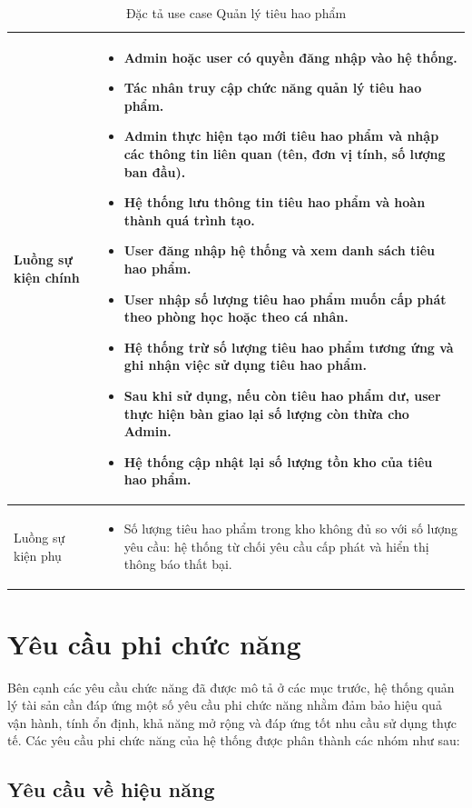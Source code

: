 \documentclass[../DoAn.tex]{subfiles}
\begin{document}
\begin{table}[H]
\begin{tabular}{|p{4cm}|p{11cm}|}
Luồng sự kiện chính &
\begin{itemize}
    \item Admin hoặc user có quyền đăng nhập vào hệ thống.
    \item Tác nhân truy cập chức năng quản lý tiêu hao phẩm.
    \item Admin thực hiện tạo mới tiêu hao phẩm và nhập các thông tin liên quan (tên, đơn vị tính, số lượng ban đầu).
    \item Hệ thống lưu thông tin tiêu hao phẩm và hoàn thành quá trình tạo.
    \item User đăng nhập hệ thống và xem danh sách tiêu hao phẩm.
    \item User nhập số lượng tiêu hao phẩm muốn cấp phát theo phòng học hoặc theo cá nhân.
    \item Hệ thống trừ số lượng tiêu hao phẩm tương ứng và ghi nhận việc sử dụng tiêu hao phẩm.
    \item Sau khi sử dụng, nếu còn tiêu hao phẩm dư, user thực hiện bàn giao lại số lượng còn thừa cho Admin.
    \item Hệ thống cập nhật lại số lượng tồn kho của tiêu hao phẩm.
\end{itemize} \\
\hline

Luồng sự kiện phụ &
\begin{itemize}
    \item Số lượng tiêu hao phẩm trong kho không đủ so với số lượng yêu cầu: hệ thống từ chối yêu cầu cấp phát và hiển thị thông báo thất bại.
\end{itemize} \\
\hline

\end{tabular}
\caption{Đặc tả use case Quản lý tiêu hao phẩm}
\end{table}

\section{Yêu cầu phi chức năng}
\label{section:2.4}

Bên cạnh các yêu cầu chức năng đã được mô tả ở các mục trước, hệ thống quản lý tài sản cần đáp ứng một số yêu cầu phi chức năng nhằm đảm bảo hiệu quả vận hành, tính ổn định, khả năng mở rộng và đáp ứng tốt nhu cầu sử dụng thực tế. Các yêu cầu phi chức năng của hệ thống được phân thành các nhóm như sau:

\subsection{Yêu cầu về hiệu năng}
\end{document}
